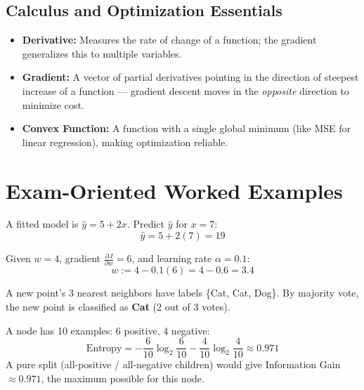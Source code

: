 \documentclass[11pt,a4paper]{article}
\begin{document}
\subsection{Calculus and Optimization Essentials}
\begin{itemize}[leftmargin=*]
  \item \textbf{Derivative:} Measures the rate of change of a function; the gradient generalizes this to multiple variables.
  \item \textbf{Gradient:} A vector of partial derivatives pointing in the direction of steepest increase of a function --- gradient descent moves in the \textit{opposite} direction to minimize cost.
  \item \textbf{Convex Function:} A function with a single global minimum (like MSE for linear regression), making optimization reliable.
\end{itemize}

\section{Exam-Oriented Worked Examples}

\begin{examplebox}
A fitted model is $\hat{y} = 5 + 2x$. Predict $\hat{y}$ for $x=7$:
$$
\hat{y} = 5 + 2(7) = 19
$$
\end{examplebox}

\begin{examplebox}
Given $w=4$, gradient $\frac{\partial J}{\partial w}=6$, and learning rate $\alpha=0.1$:
$$
w := 4 - 0.1(6) = 4 - 0.6 = 3.4
$$
\end{examplebox}

\begin{examplebox}[Worked Example 3: KNN Classification ($k=3$)]
A new point's 3 nearest neighbors have labels \{Cat, Cat, Dog\}. By majority vote, the new point is classified as \textbf{Cat} (2 out of 3 votes).
\end{examplebox}

\begin{examplebox}
A node has 10 examples: 6 positive, 4 negative:
$$
\text{Entropy} = -\frac{6}{10}\log_2\frac{6}{10} - \frac{4}{10}\log_2\frac{4}{10} \approx 0.971
$$
A pure split (all-positive / all-negative children) would give Information Gain $\approx 0.971$, the maximum possible for this node.
\end{examplebox}
\end{document}
